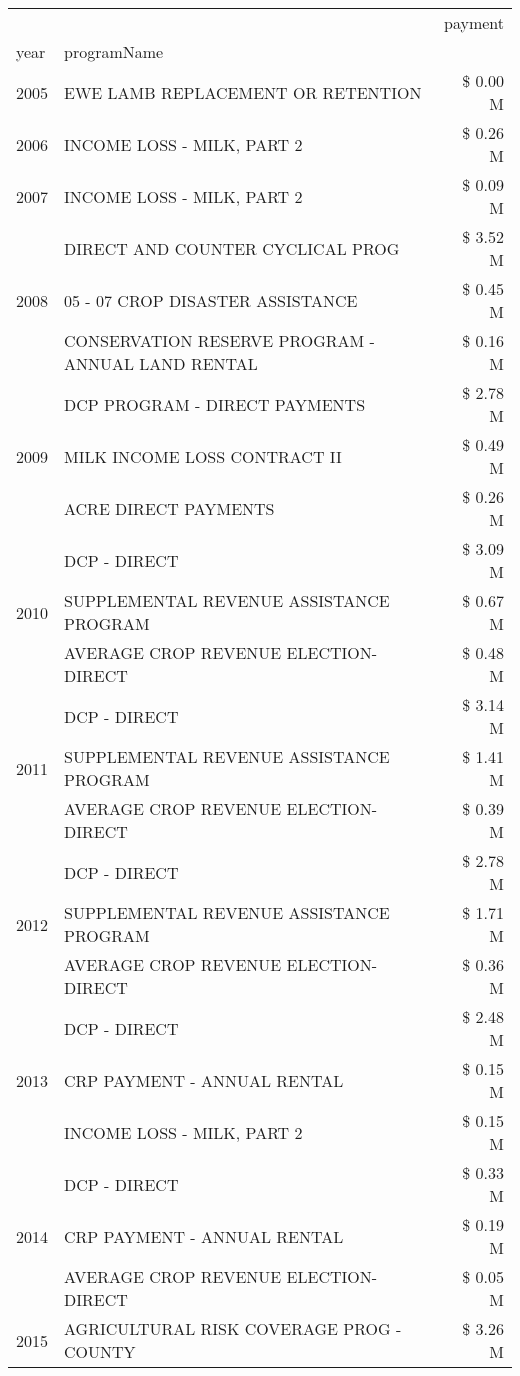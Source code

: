 \begin{tabular}{llr}
\toprule
 &  & payment \\
year & programName &  \\
\midrule
2005 & EWE LAMB REPLACEMENT OR RETENTION & \$ 0.00 M \\
\cline{1-3}
2006 & INCOME LOSS - MILK, PART 2 & \$ 0.26 M \\
\cline{1-3}
2007 & INCOME LOSS - MILK, PART 2 & \$ 0.09 M \\
\cline{1-3}
\multirow[t]{3}{*}{2008} & DIRECT AND COUNTER CYCLICAL PROG & \$ 3.52 M \\
 & 05 - 07 CROP DISASTER ASSISTANCE & \$ 0.45 M \\
 & CONSERVATION RESERVE PROGRAM - ANNUAL LAND RENTAL & \$ 0.16 M \\
\cline{1-3}
\multirow[t]{3}{*}{2009} & DCP PROGRAM - DIRECT PAYMENTS & \$ 2.78 M \\
 & MILK INCOME LOSS CONTRACT II & \$ 0.49 M \\
 & ACRE DIRECT PAYMENTS & \$ 0.26 M \\
\cline{1-3}
\multirow[t]{3}{*}{2010} & DCP - DIRECT & \$ 3.09 M \\
 & SUPPLEMENTAL REVENUE ASSISTANCE PROGRAM & \$ 0.67 M \\
 & AVERAGE CROP REVENUE ELECTION-DIRECT & \$ 0.48 M \\
\cline{1-3}
\multirow[t]{3}{*}{2011} & DCP - DIRECT & \$ 3.14 M \\
 & SUPPLEMENTAL REVENUE ASSISTANCE PROGRAM & \$ 1.41 M \\
 & AVERAGE CROP REVENUE ELECTION-DIRECT & \$ 0.39 M \\
\cline{1-3}
\multirow[t]{3}{*}{2012} & DCP - DIRECT & \$ 2.78 M \\
 & SUPPLEMENTAL REVENUE ASSISTANCE PROGRAM & \$ 1.71 M \\
 & AVERAGE CROP REVENUE ELECTION-DIRECT & \$ 0.36 M \\
\cline{1-3}
\multirow[t]{3}{*}{2013} & DCP - DIRECT & \$ 2.48 M \\
 & CRP PAYMENT - ANNUAL RENTAL & \$ 0.15 M \\
 & INCOME LOSS - MILK, PART 2 & \$ 0.15 M \\
\cline{1-3}
\multirow[t]{3}{*}{2014} & DCP - DIRECT & \$ 0.33 M \\
 & CRP PAYMENT - ANNUAL RENTAL & \$ 0.19 M \\
 & AVERAGE CROP REVENUE ELECTION-DIRECT & \$ 0.05 M \\
\cline{1-3}
\multirow[t]{3}{*}{2015} & AGRICULTURAL RISK COVERAGE PROG - COUNTY & \$ 3.26 M \\

\end{tabular}
